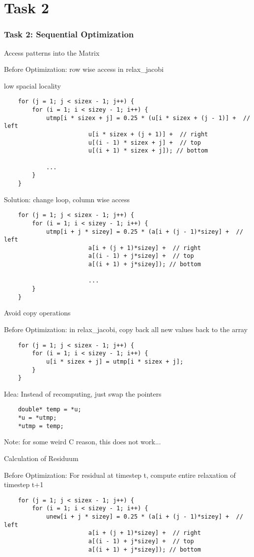 \section{Task 2}
\begin{frame}
\frametitle{Task 2: Sequential Optimization}
Access patterns into the Matrix
\item Before Optimization: row wise access in relax_jacobi
\item low spacial locality
\begin{lstlisting}
	for (j = 1; j < sizex - 1; j++) {
		for (i = 1; i < sizey - 1; i++) {
			utmp[i * sizex + j] = 0.25 * (u[i * sizex + (j - 1)] +  // left
						u[i * sizex + (j + 1)] +  // right
						u[(i - 1) * sizex + j] +  // top
						u[(i + 1) * sizex + j]); // bottom

			...
		}
	}
\end{lstlisting}
\item{Solution: change loop, column wise access }
\begin{lstlisting}
	for (j = 1; j < sizex - 1; j++) {
		for (i = 1; i < sizey - 1; i++) {
			utmp[i + j * sizey] = 0.25 * (a[i + (j - 1)*sizey] +  // left
						a[i + (j + 1)*sizey] +  // right
						a[(i - 1) + j*sizey] +  // top
						a[(i + 1) + j*sizey]); // bottom
						
						...
		}
	}
\end{lstlisting}

Avoid copy operations
\item Before Optimization: in relax_jacobi, copy back all new values back to the array
\begin{lstlisting}
	for (j = 1; j < sizex - 1; j++) {
		for (i = 1; i < sizey - 1; i++) {
			u[i * sizex + j] = utmp[i * sizex + j];
		}
	}
\end{lstlisting}
\item Idea: Instead of recomputing, just swap the pointers
\begin{lstlisting}
	double* temp = *u;
	*u = *utmp;
	*utmp = temp;
\end{lstlisting}
\item Note: for some weird C reason, this does not work...


Calculation of Residuum
\item Before Optimization: For residual at timestep t, compute entire relaxation of timestep t+1
\begin{lstlisting}
	for (j = 1; j < sizex - 1; j++) {
		for (i = 1; i < sizey - 1; i++) {
			unew[i + j * sizey] = 0.25 * (a[i + (j - 1)*sizey] +  // left
						a[i + (j + 1)*sizey] +  // right
						a[(i - 1) + j*sizey] +  // top
						a[(i + 1) + j*sizey]); // bottom
						

\end{lstlisting}
\end{frame}
